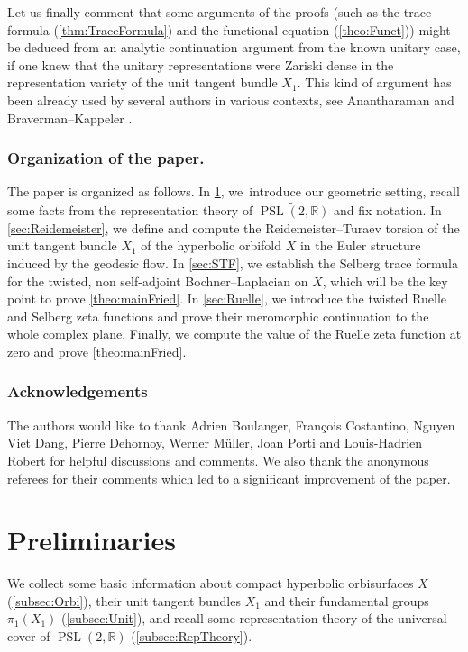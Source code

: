 \documentclass[JEP,XML,SOM,Unicode,NoFloatCountersInSection,published]{cedram}
\theoremstyle{plain}
\theoremstyle{definition}
\theoremstyle{remark}
\newcommand{\R}{\mathbb{R}}
\DeclareMathOperator{\PSL}{PSL}
\numberwithin{equation}{section}
\begin{document}
Let us finally comment that some arguments of the proofs (such as the trace formula (\cref{thm:TraceFormula}) and the functional equation (\cref{theo:Funct})) might be deduced from an analytic continuation argument from the known unitary case, if one knew that the unitary representations were Zariski dense in the representation variety of the unit tangent bundle $X_1$. This kind of argument has been already used by several authors in various contexts, see Anantharaman \cite{Anan} and Braverman--Kappeler \cite{BK}.

\subsubsection*{Organization of the paper.}
The paper is organized as follows.
In \cref{sec:Prel}, we~introduce our geometric setting, recall some facts from the representation theory
of $\widetilde{\PSL(2,\R)}$ and fix notation.
In \cref{sec:Reidemeister}, we define and compute the Reidemeister--Turaev torsion of the unit tangent bundle $X_1$ of the hyperbolic orbifold $X$ in the Euler structure induced by the geodesic flow. In \cref{sec:STF}, we establish the Selberg trace formula for the twisted, non self-adjoint Bochner--Laplacian on $X$,
which will be the key point to prove \cref{theo:mainFried}.
In \cref{sec:Ruelle}, we introduce the twisted Ruelle and Selberg zeta functions
and prove their meromorphic continuation to the whole complex plane.
Finally, we compute the value of the Ruelle zeta function at zero and
prove \cref{theo:mainFried}.

\subsubsection*{Acknowledgements}
The authors would like to thank Adrien Boulanger, François Costantino, Nguyen Viet Dang, Pierre Dehornoy, Werner Müller, Joan Porti and Louis-Hadrien Robert for helpful discussions and comments. We also thank the anonymous referees for their comments which led to a significant improvement of the paper.

\section{Preliminaries}
\label{sec:Prel}
We collect some basic information about compact hyperbolic orbisurfaces $X$ (\cref{subsec:Orbi}), their unit tangent bundles $X_1$ and their fundamental groups $\pi_1(X_1)$ (\cref{subsec:Unit}), and recall some representation theory of the universal cover of $\PSL(2,\R)$ (\cref{subsec:RepTheory}).
\end{document}
